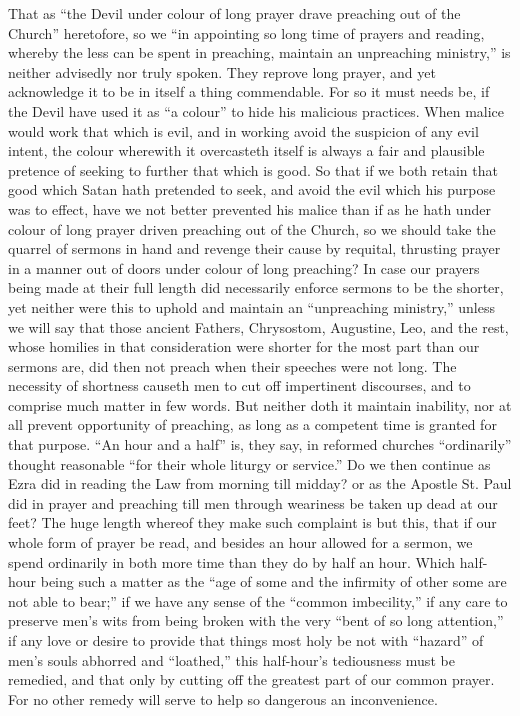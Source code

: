 That as “the Devil under colour of long prayer drave preaching out of the Church” heretofore, so we “in appointing so long time of prayers and reading, whereby the less can be spent in preaching, maintain an unpreaching ministry,” is neither advisedly nor truly spoken. They reprove long prayer, and yet acknowledge it to be in itself a thing commendable. For so it must needs be, if the Devil have used it as “a colour” to hide his malicious practices. When malice would work that which is evil, and in working avoid  the suspicion of any evil intent, the colour wherewith it overcasteth itself is always a fair and plausible pretence of seeking to further that which is good. So that if we both retain that good which Satan hath pretended to seek, and avoid the evil which his purpose was to effect, have we not better prevented his malice than if as he hath under colour of long prayer driven preaching out of the Church, so we should take the quarrel of sermons in hand and revenge their cause by requital, thrusting prayer in a manner out of doors under colour of long preaching?
In case our prayers being made at their full length did necessarily enforce sermons to be the shorter, yet neither were this to uphold and maintain an “unpreaching ministry,” unless we will say that those ancient Fathers, Chrysostom, Augustine, Leo, and the rest, whose homilies in that consideration were shorter for the most part than our sermons are, did then not preach when their speeches were not long. The necessity of shortness causeth men to cut off impertinent discourses, and to comprise much matter in few words. But neither doth it maintain inability, nor at all prevent opportunity of preaching, as long as a competent time is granted for that purpose.
“An hour and a half” is, they say, in reformed churches “ordinarily” thought reasonable “for their whole liturgy or service.” Do we then continue as Ezra did in reading the Law from morning till midday? or as the Apostle St. Paul did in prayer and preaching till men through weariness be taken up dead at our feet? The huge length whereof they make such complaint is but this, that if our whole form of prayer be read, and besides an hour allowed for a sermon, we spend ordinarily in both more time than they do by half an hour. Which half-hour being such a  matter as the “age of some and the infirmity of other some are not able to bear;” if we have any sense of the “common imbecility,” if any care to preserve men’s wits from being broken with the very “bent of so long attention,” if any love or desire to provide that things most holy be not with “hazard” of men’s souls abhorred and “loathed,” this half-hour’s tediousness must be remedied, and that only by cutting off the greatest part of our common prayer. For no other remedy will serve to help so dangerous an inconvenience.

